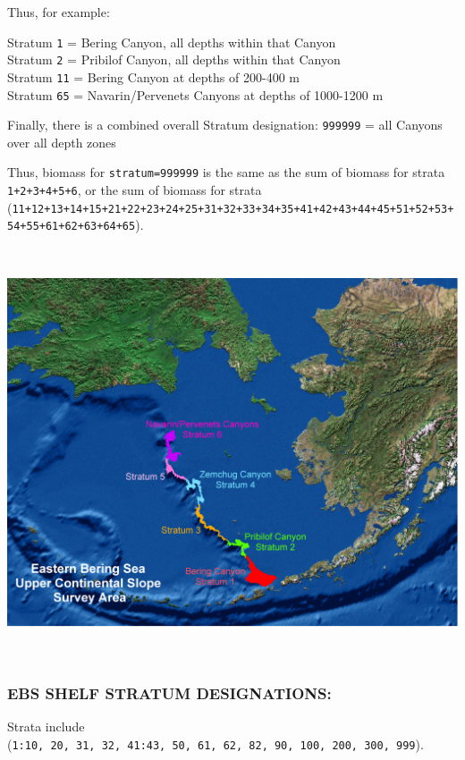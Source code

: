 \documentclass[
]{book}
\begin{document}
Thus, for example:

Stratum \texttt{1} = Bering Canyon, all depths within that Canyon\\
Stratum \texttt{2} = Pribilof Canyon, all depths within that Canyon\\
Stratum \texttt{11} = Bering Canyon at depths of 200-400 m\\
Stratum \texttt{65} = Navarin/Pervenets Canyons at depths of 1000-1200 m

Finally, there is a combined overall Stratum designation:
\texttt{999999} = all Canyons over all depth zones

Thus, biomass for \texttt{stratum=999999} is the same as the sum of biomass for strata \texttt{1+2+3+4+5+6}, or the sum of biomass for strata (\texttt{11+12+13+14+15+21+22+23+24+25+31+32+33+34+35+41+42+43+44+45+51+52+53+54+55+61+62+63+64+65}).

\includegraphics[width=800px,height=460px]{figs/EBS_slope_strata}

\hypertarget{ebs-shelf-stratum-designations}{%
\subsubsection{EBS SHELF STRATUM DESIGNATIONS:}\label{ebs-shelf-stratum-designations}}

Strata include (\texttt{1:10,\ 20,\ 31,\ 32,\ 41:43,\ 50,\ 61,\ 62,\ 82,\ 90,\ 100,\ 200,\ 300,\ 999}).
\end{document}
